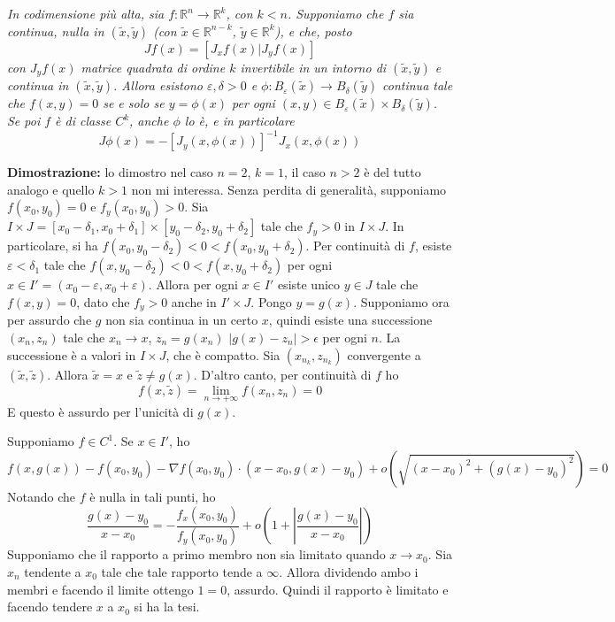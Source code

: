 \documentclass[a4paper,11pt]{article}
\begin{document}
\begin{enumerate}
	\textit{In codimensione più alta, sia $f\colon\mathbb{R}^n\to\mathbb{R}^k$, con $k<n$. Supponiamo che $f$ sia continua, nulla in $(\tilde{x},\tilde{y})$ (con $\tilde{x}\in\mathbb{R}^{n-k}$, $\tilde y\in\mathbb{R}^k$), e che, posto}
	\[Jf(x)=\left[J_xf(x)|J_yf(x)\right]\]
	\textit{con $J_yf(x)$ matrice quadrata di ordine $k$ invertibile in un intorno di $(\tilde{x},\tilde{y})$ e continua in $(\tilde{x},\tilde{y})$. Allora esistono $\varepsilon,\delta>0$ e $\phi\colon B_\varepsilon(\tilde{x})\to B_\delta(\tilde{y})$ continua tale che $f(x,y)=0$ se e solo se $y=\phi(x)$ per ogni $(x,y)\in B_\varepsilon(\tilde{x})\times B_\delta(\tilde{y})$. Se poi $f$ è di classe $C^k$, anche $\phi$ lo è, e in particolare
	\[J\phi(x)=-[J_y(x,\phi(x))]^{-1}J_x(x,\phi(x))\] }
	

	\textbf{Dimostrazione:} lo dimostro nel caso $n=2$, $k=1$, il caso $n>2$ è del tutto analogo e quello $k>1$ non mi interessa. Senza perdita di generalità, supponiamo $f(x_0,y_0)=0$ e $f_y(x_0,y_0)>0$. Sia $I\times J=[x_0-\delta_1,x_0+\delta_1]\times[y_0-\delta_2,y_0+\delta_2]$ tale che $f_y>0$ in $I\times J$. In particolare, si ha $f(x_0,y_0-\delta_2)<0<f(x_0,y_0+\delta_2)$. Per continuità di $f$, esiste $\varepsilon<\delta_1$ tale che $f(x,y_0-\delta_2)<0<f(x,y_0+\delta_2)$ per ogni $x\in I'=(x_0-\varepsilon,x_0+\varepsilon)$. Allora per ogni $x\in I'$ esiste unico $y\in J$ tale che $f(x,y)=0$, dato che $f_y>0$ anche in $I'\times J$. Pongo $y=g(x)$. Supponiamo ora per assurdo che $g$ non sia continua in un certo $x$, quindi esiste una successione $(x_n,z_n)$ tale che $x_n\to x$, $z_n=g(x_n)$ $|g(x)-z_n|>\epsilon$ per ogni $n$. La successione è a valori in $I\times J$, che è compatto. Sia $(x_{n_k},z_{n_k})$ convergente a $(\tilde{x},\tilde{z})$. Allora $\tilde{x}=x$ e $\tilde{z}\neq g(x)$. D'altro canto, per continuità di $f$ ho \[f(x,\tilde{z})=\lim\limits_{n\to+\infty}f(x_n,z_n)=0\]
	E questo è assurdo per l'unicità di $g(x)$.
	
	Supponiamo $f\in C^1$. Se $x\in I'$, ho
	\[f(x,g(x))-f(x_0,y_0)-\nabla f(x_0,y_0)\cdot(x-x_0,g(x)-y_0)+o(\sqrt{(x-x_0)^2+(g(x)-y_0)^2})=0\]
	Notando che $f$ è nulla in tali punti, ho
	\[\frac{g(x)-y_0}{x-x_0}=-\frac{f_x(x_0,y_0)}{f_y(x_0,y_0)}+o\left(1+\left|\frac{g(x)-y_0}{x-x_0}\right|\right)\]
	Supponiamo che il rapporto a primo membro non sia limitato quando $x\to x_0$. Sia $x_n$ tendente a $x_0$ tale che tale rapporto tende a $\infty$. Allora dividendo ambo i membri e facendo il limite ottengo $1=0$, assurdo. Quindi il rapporto è limitato e facendo tendere $x$ a $x_0$ si ha la tesi.
	

\end{enumerate}
\end{document}
